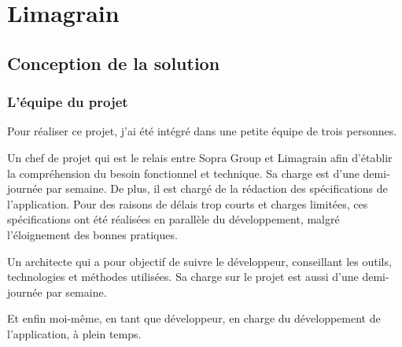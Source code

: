 \cleardoublepage

\chapter{Limagrain}


\section{Conception de la solution}


\subsection{L'équipe du projet}

Pour réaliser ce projet, j'ai été intégré dans une petite équipe de trois personnes.

Un chef de projet qui est le relais entre Sopra Group et Limagrain afin d'établir la compréhension du besoin fonctionnel et technique.
Sa charge est d'une demi-journée par semaine.
De plus, il est chargé de la rédaction des spécifications de l'application.
Pour des raisons de délais trop courts et charges limitées, ces spécifications ont été réalisées en parallèle du développement, malgré l'éloignement des bonnes pratiques.

Un architecte qui a pour objectif de suivre le développeur, conseillant les outils, technologies et méthodes utilisées.
Sa charge sur le projet est aussi d'une demi-journée par semaine.

Et enfin moi-même, en tant que développeur, en charge du développement de l'application, à plein temps.


